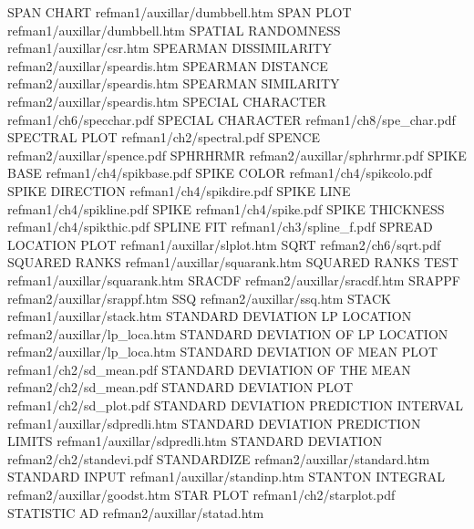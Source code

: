 SPAN CHART                              refman1/auxillar/dumbbell.htm
SPAN PLOT                               refman1/auxillar/dumbbell.htm
SPATIAL RANDOMNESS                      refman1/auxillar/csr.htm
SPEARMAN DISSIMILARITY                  refman2/auxillar/speardis.htm
SPEARMAN DISTANCE                       refman2/auxillar/speardis.htm
SPEARMAN SIMILARITY                     refman2/auxillar/speardis.htm
SPECIAL CHARACTER                       refman1/ch6/specchar.pdf
SPECIAL CHARACTER                       refman1/ch8/spe_char.pdf
SPECTRAL PLOT                           refman1/ch2/spectral.pdf
SPENCE                                  refman2/auxillar/spence.pdf
SPHRHRMR                                refman2/auxillar/sphrhrmr.pdf
SPIKE BASE                              refman1/ch4/spikbase.pdf
SPIKE COLOR                             refman1/ch4/spikcolo.pdf
SPIKE DIRECTION                         refman1/ch4/spikdire.pdf
SPIKE LINE                              refman1/ch4/spikline.pdf
SPIKE                                   refman1/ch4/spike.pdf
SPIKE THICKNESS                         refman1/ch4/spikthic.pdf
SPLINE FIT                              refman1/ch3/spline_f.pdf
SPREAD LOCATION PLOT                    refman1/auxillar/slplot.htm
SQRT                                    refman2/ch6/sqrt.pdf
SQUARED RANKS                           refman1/auxillar/squarank.htm
SQUARED RANKS TEST                      refman1/auxillar/squarank.htm
SRACDF                                  refman2/auxillar/sracdf.htm
SRAPPF                                  refman2/auxillar/srappf.htm
SSQ                                     refman2/auxillar/ssq.htm
STACK                                   refman1/auxillar/stack.htm
STANDARD DEVIATION LP LOCATION          refman2/auxillar/lp_loca.htm
STANDARD DEVIATION OF LP LOCATION       refman2/auxillar/lp_loca.htm
STANDARD DEVIATION OF MEAN PLOT         refman1/ch2/sd_mean.pdf
STANDARD DEVIATION OF THE MEAN          refman2/ch2/sd_mean.pdf
STANDARD DEVIATION PLOT                 refman1/ch2/sd_plot.pdf
STANDARD DEVIATION PREDICTION INTERVAL  refman1/auxillar/sdpredli.htm
STANDARD DEVIATION PREDICTION LIMITS    refman1/auxillar/sdpredli.htm
STANDARD DEVIATION                      refman2/ch2/standevi.pdf
STANDARDIZE                             refman2/auxillar/standard.htm
STANDARD INPUT                          refman1/auxillar/standinp.htm
STANTON INTEGRAL                        refman2/auxillar/goodst.htm
STAR PLOT                               refman1/ch2/starplot.pdf
STATISTIC AD                            refman2/auxillar/statad.htm
